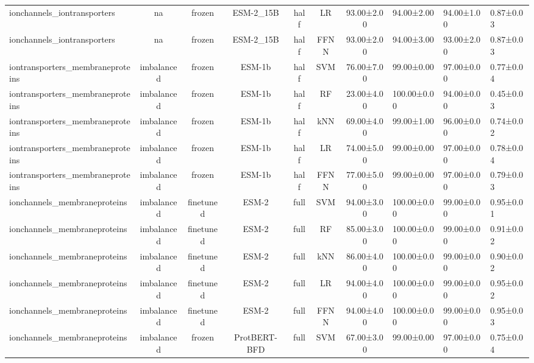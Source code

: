 \begin{tabular}{lcccccc}
     ionchannels\_iontransporters &         na &         frozen &    ESM-2\_15B &      half &         LR &  93.00±2.00 &  94.00±2.00 &  94.00±1.00 & 0.87±0.03 \\
     ionchannels\_iontransporters &         na &         frozen &    ESM-2\_15B &      half &       FFNN &  93.00±2.00 &  94.00±3.00 &  93.00±2.00 & 0.87±0.03 \\
iontransporters\_membraneproteins & imbalanced &         frozen &       ESM-1b &      half &        SVM &  76.00±7.00 &  99.00±0.00 &  97.00±0.00 & 0.77±0.04 \\
iontransporters\_membraneproteins & imbalanced &         frozen &       ESM-1b &      half &         RF &  23.00±4.00 & 100.00±0.00 &  94.00±0.00 & 0.45±0.03 \\
iontransporters\_membraneproteins & imbalanced &         frozen &       ESM-1b &      half &        kNN &  69.00±4.00 &  99.00±1.00 &  96.00±0.00 & 0.74±0.02 \\
iontransporters\_membraneproteins & imbalanced &         frozen &       ESM-1b &      half &         LR &  74.00±5.00 &  99.00±0.00 &  97.00±0.00 & 0.78±0.04 \\
iontransporters\_membraneproteins & imbalanced &         frozen &       ESM-1b &      half &       FFNN &  77.00±5.00 &  99.00±0.00 &  97.00±0.00 & 0.79±0.03 \\
    ionchannels\_membraneproteins & imbalanced &      finetuned &        ESM-2 &      full &        SVM &  94.00±3.00 & 100.00±0.00 &  99.00±0.00 & 0.95±0.01 \\
    ionchannels\_membraneproteins & imbalanced &      finetuned &        ESM-2 &      full &         RF &  85.00±3.00 & 100.00±0.00 &  99.00±0.00 & 0.91±0.02 \\
    ionchannels\_membraneproteins & imbalanced &      finetuned &        ESM-2 &      full &        kNN &  86.00±4.00 & 100.00±0.00 &  99.00±0.00 & 0.90±0.02 \\
    ionchannels\_membraneproteins & imbalanced &      finetuned &        ESM-2 &      full &         LR &  94.00±4.00 & 100.00±0.00 &  99.00±0.00 & 0.95±0.02 \\
    ionchannels\_membraneproteins & imbalanced &      finetuned &        ESM-2 &      full &       FFNN &  94.00±4.00 & 100.00±0.00 &  99.00±0.00 & 0.95±0.03 \\
    ionchannels\_membraneproteins & imbalanced &         frozen & ProtBERT-BFD &      full &        SVM &  67.00±3.00 &  99.00±0.00 &  97.00±0.00 & 0.75±0.04 \\

\end{tabular}
